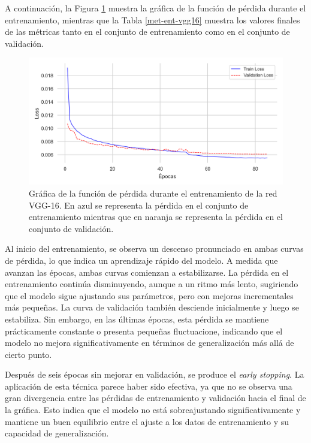 A continuación, la Figura \ref{fig30} muestra la gráfica de la función de pérdida durante el entrenamiento, mientras que la Tabla \ref{met-ent-vgg16} muestra los valores finales de las métricas tanto en el conjunto de entrenamiento como en el conjunto de validación.

\begin{figure}[h]
	\centering
	\includegraphics[scale=0.6]{imagenes/cap5/train_loss_vgg16.png}
	\caption[Gráfica de pérdida VGG-16.]{Gráfica de la función de pérdida durante el entrenamiento de la red VGG-16. En azul se representa la pérdida en el conjunto de entrenamiento mientras que en naranja se representa la pérdida en el conjunto de validación.}
	\label{fig30}
\end{figure}

Al inicio del entrenamiento, se observa un descenso pronunciado en ambas curvas de pérdida, lo que indica un aprendizaje rápido del modelo. A medida que avanzan las épocas, ambas curvas comienzan a estabilizarse. La pérdida en el entrenamiento continúa disminuyendo, aunque a un ritmo más lento, sugiriendo que el modelo sigue ajustando sus parámetros, pero con mejoras incrementales más pequeñas. La curva de validación también desciende inicialmente y luego se estabiliza. Sin embargo, en las últimas épocas, esta pérdida se mantiene prácticamente constante o presenta pequeñas fluctuacione, indicando que el modelo no mejora significativamente en términos de generalización más allá de cierto punto.

Después de seis épocas sin mejorar en validación, se produce el \textit{early stopping}. La aplicación de esta técnica parece haber sido efectiva, ya que no se observa una gran divergencia entre las pérdidas de entrenamiento y validación hacia el final de la gráfica. Esto indica que el modelo no está sobreajustando significativamente y mantiene un buen equilibrio entre el ajuste a los datos de entrenamiento y su capacidad de generalización.


